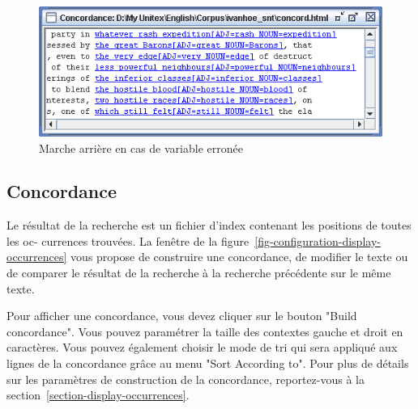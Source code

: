 \bigskip
\begin{figure}[!h]
\begin{center}
\includegraphics[width=13cm]{resources/img/fig6-advanced-options8.png}
\caption{Marche arrière en cas de variable erronée\label{fig6-advanced-options8}}
\end{center}
\end{figure}



\subsection{Concordance}
Le résultat de la recherche est un fichier d’index contenant les positions de toutes les oc-
currences trouvées. La fenêtre de la figure~\ref{fig-configuration-display-occurrences}                                               vous propose de construire une concordance,
de modifier le texte ou de comparer le résultat de la recherche à la recherche précédente sur
le même texte.


\bigskip
{}
\noindent Pour afficher une concordance, vous devez cliquer sur le bouton "Build concordance".
Vous pouvez paramétrer la taille des contextes gauche et droit en caractères. Vous pouvez
également choisir le mode de tri qui sera appliqué aux lignes de la concordance grâce au
menu "Sort According to". Pour plus de détails sur les paramètres de construction de la
concordance, reportez-vous à la section~\ref{section-display-occurrences}.

